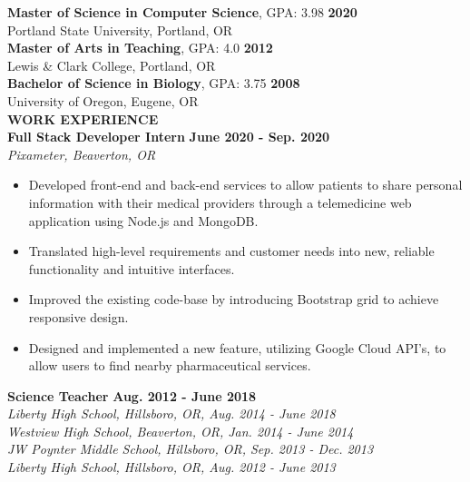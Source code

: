 \documentclass[11pt]{article}
\begin{document}
%
\textbf{Master of Science in Computer Science}, GPA: 3.98
\hfill \textbf{2020}\\ 
Portland State University, Portland, OR
\medskip \\
%
\textbf{Master of Arts in Teaching}, GPA: 4.0
\hfill \textbf{2012} \\
Lewis \& Clark College, Portland, OR
\medskip \\
%
\textbf{Bachelor of Science in Biology}, GPA: 3.75
\hfill \textbf{2008}\\
University of Oregon, Eugene, OR
\bigskip \\
\makebox[0pt][l]{\rule[-.2\baselineskip]{\linewidth}{.3mm}}%
\large{\textbf{WORK EXPERIENCE}}\smallskip \\
%
\textbf{Full Stack Developer Intern} \hfill \textbf{June 2020 - Sep. 2020}\\
\textit{Pixameter, Beaverton, OR}
\begin{itemize}[leftmargin=*, itemsep=0pt, topsep=5pt]
	\item Developed front-end and back-end services to allow patients to share personal information with their medical providers through a telemedicine web application using Node.js and MongoDB.
	\item Translated high-level requirements and customer needs into new, reliable functionality and intuitive interfaces.
	\item Improved the existing code-base by introducing Bootstrap grid to achieve responsive design.
	\item Designed and implemented a new feature, utilizing Google Cloud API's, to allow users to find nearby pharmaceutical services.
\end{itemize}
\medbreak \noindent
%
\textbf{Science Teacher} \hfill \textbf{Aug. 2012 - June 2018}\\
\textit{Liberty High School, Hillsboro, OR, Aug. 2014 - June 2018}\\
\textit{Westview High School, Beaverton, OR, Jan. 2014 - June 2014}\\
\textit{JW Poynter Middle School, Hillsboro, OR, Sep. 2013 - Dec. 2013}\\
\textit{Liberty High School, Hillsboro, OR, Aug. 2012 - June 2013}
\end{document}
